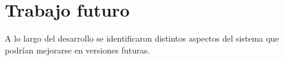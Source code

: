 

\section{Trabajo futuro}

A lo largo del desarrollo se identificaron distintos aspectos del sistema que podrían mejorarse en versiones futuras.


